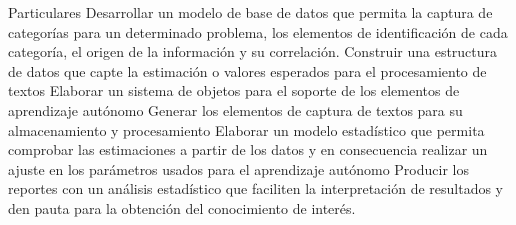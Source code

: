 Particulares
Desarrollar un modelo de base de datos que permita la captura de categorías para un determinado problema, los elementos de identificación de cada categoría, el origen de la información y su correlación.
Construir una estructura de datos que capte la estimación o valores esperados para el procesamiento de textos
Elaborar un sistema de objetos para el soporte de los elementos de aprendizaje autónomo
Generar los elementos de captura de textos para su almacenamiento y procesamiento
Elaborar un modelo estadístico que permita comprobar las estimaciones a partir de los datos y en consecuencia realizar un ajuste en los parámetros usados para el aprendizaje autónomo
Producir los reportes con un análisis estadístico que faciliten la interpretación de resultados y den pauta para la obtención del conocimiento de interés.
